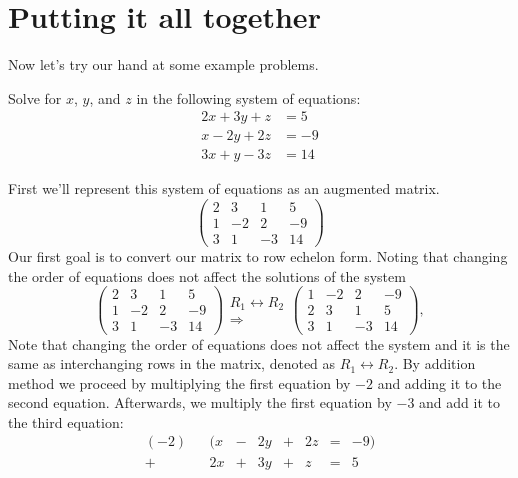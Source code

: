 \documentclass{ximera}
\begin{document}
\section{Putting it all together}

Now let's try our hand at some example problems. 


\begin{example}
  Solve for $x$, $y$, and $z$ in the following system of equations:
  \begin{align*}
    2x + 3y + z  &= 5 \\
    x -2y+ 2z &=-9\\
    3x +y- 3z &=14
  \end{align*}

\begin{explanation}
First we'll represent this system of equations as an augmented matrix.
\[
\left(\begin{array}{ccc|c}
  2 & 3 & 1 & 5 \\
  1 &  -2 & 2 &-9 \\
  3 &  1 & -3 & 14
\end{array}\right)
\]
Our first goal is to convert our matrix to row echelon form. Noting
that changing the order of equations does not affect the solutions of the system
\[
\left(\begin{array}{ccc|c}
  2 & 3 & 1 & 5 \\
  1 &  -2 & 2 &-9 \\
  3 &  1 & -3 & 14
\end{array}\right)
\begin{array}{c}
  R_1\leftrightarrow R_2\\\Longrightarrow
\end{array}
\left(\begin{array}{ccc|c}
  1 &  -2 & 2 &-9 \\
  2 & 3 & 1 & 5 \\
  3 &  1 & -3 & 14
\end{array}\right),
\]
Note that changing the order of equations does not affect the system
and it is the same as interchanging rows in the matrix, denoted as
$R_1 \leftrightarrow R_2$. By addition method we proceed by
multiplying the first equation by $-2$ and adding it to the second
equation. Afterwards, we multiply the first equation by $-3$ and add
it to the third equation:
\[
\begin{array}{ccccccccc}
     (-2)&&(x& -&2y&+&2z&=&-9)\\
     +&& 2x &+& 3y &+& z &=& 5 \\

\end{array}\]
\end{explanation}
\end{example}
\end{document}
